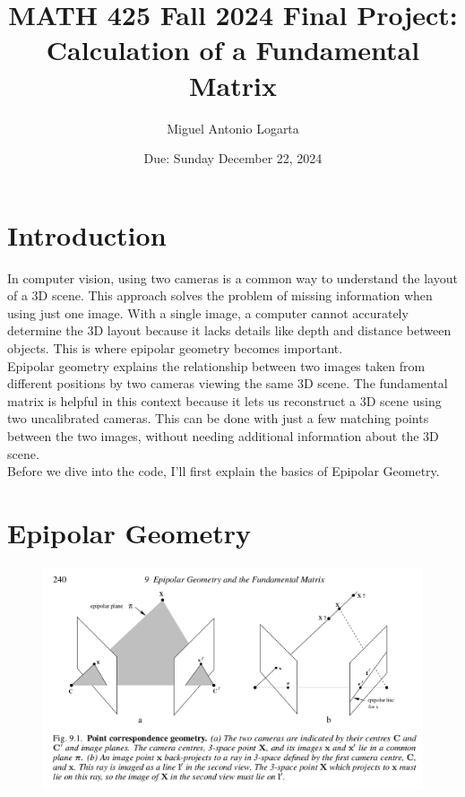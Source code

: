 \documentclass{article}
\title{MATH 425 Fall 2024 Final Project: \\ Calculation of a Fundamental Matrix}
\date{Due: Sunday December 22, 2024}
\author{Miguel Antonio Logarta}
\begin{document}
\maketitle  %
\thispagestyle{fancy}

\section{Introduction}
In computer vision, using two cameras is a common way to understand the layout of a 3D scene. This approach solves the problem of missing information when using just one image. With a single image, a computer cannot accurately determine the 3D layout because it lacks details like depth and distance between objects. This is where epipolar geometry becomes important. \\

Epipolar geometry explains the relationship between two images taken from different positions by two cameras viewing the same 3D scene. The fundamental matrix is helpful in this context because it lets us reconstruct a 3D scene using two uncalibrated cameras. This can be done with just a few matching points between the two images, without needing additional information about the 3D scene.\\

Before we dive into the code, I'll first explain the basics of Epipolar Geometry.

\section{Epipolar Geometry}
\begin{figure}[H]
    \centering
    \includegraphics[width=1\textwidth]{epipolar_geometry.png}
\end{figure}
\end{document}
